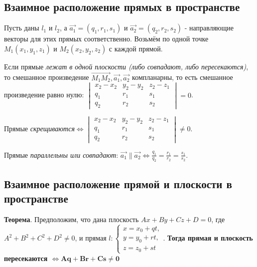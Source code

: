 \documentclass[a4paper]{article}
\begin{document}
\newpage \begin{center}\begin{Large}\end{Large}\end{center}
\subsection*{Взаимное расположение прямых в пространстве}
Пусть даны $l_1$ и $l_2$, а $\vec{a_1} = (q_1, r_1, s_1)$ и $\vec{a_2} = (q_2, r_2, s_2)$ - направляющие векторы для этих прямых соответственно. Возьмём по одной точке $M_1(x_1, y_1, z_1)$ и $M_2(x_2, y_2, z_2)$ с каждой прямой.

Если прямые \textit{лежат в одной плоскости (либо совпадают, либо пересекаются)}, то смешанное произведение $\overrightarrow{M_1M_2}, \vec{a_1}, \vec{a_2}$ компланарны, то есть смешанное произведение равно нулю: $\displaystyle \begin{vmatrix}
x_2-x_2& y_2-y_2& z_2-z_1\\
q_1& r_1& s_1\\
q_2& r_2& s_2
\end{vmatrix} = 0$.

Прямые \textit{скрещиваются}$\displaystyle \Leftrightarrow \begin{vmatrix}
x_2-x_2& y_2-y_2& z_2-z_1\\
q_1& r_1& s_1\\
q_2& r_2& s_2
\end{vmatrix} \neq 0$.

Прямые \textit{параллельны или совпадают}: $\displaystyle \vec{a_1} \parallel \vec{a_2} \Leftrightarrow \frac{q_1}{q_2} = \frac{r_1}{r_2} = \frac{s_1}{s_2}$.

\newpage \begin{center}\begin{Large}\end{Large}\end{center}
\subsection*{Взаимное расположение прямой и плоскости в пространстве}

\begin{htheorem}
\textbf{Теорема}. Предположим, что дана плоскость $Ax+By+Cz+D=0$, где $A^2+B^2+C^2+D^2\neq 0$, и прямая $\displaystyle l: \begin{cases}
x=x_0+qt,
\\
y=y_0+rt,
\\
z=z_0+st
\end{cases}$. \textbf{Тогда прямая и плоскость пересекаются $\mathbf{\Leftrightarrow Aq+Br+Cs \neq 0}$}
\end{htheorem}
\end{document}
